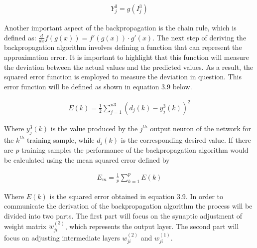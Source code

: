 \documentclass[
  12pt,
]{report}
\begin{document}
\begin{equation}
\begin{aligned}
Y_{j}^3 = g(I_{j}^3)
\label{eq:equation 3.8}
\end{aligned}
\end{equation} \vspace{-1em}

Another important aspect of the backpropagation is the chain rule, which
is defined as: \(\frac{d}{dx} f(g(x)) = f'(g(x)) \cdot g'(x)\). The next
step of deriving the backpropagation algorithm involves defining a
function that can represent the approximation error. It is important to
highlight that this function will measure the deviation between the
actual values and the predicted values. As a result, the squared error
function is employed to measure the deviation in question. This error
function will be defined as shown in equation 3.9 below.

\vspace{-1em}

\begin{equation}
\begin{aligned}
E(k) = \frac{1}{2} \sum_{j=1}^{n3} \left( d_j(k) - y_j^3(k) \right)^2
\label{eq:equation 3.9}
\end{aligned}
\end{equation} \vspace{-1em}

Where \(y_{j}^3 (k)\) is the value produced by the \(j^{th}\) output
neuron of the network for the \(k^{th}\) training sample, while
\(d_j (k)\) is the corresponding desired value. If there are \(p\)
training samples the performance of the backpropagation algorithm would
be calculated using the mean squared error defined by

\vspace{-1em}

\begin{equation}
\begin{aligned}
E_m = \frac{1}{p} \sum_{k=1}^{p} E(k)
\label{eq:equation 3.10}
\end{aligned}
\end{equation} \vspace{-1em}

Where \(E(k)\) is the squared error obtained in equation 3.9. In order
to communicate the derivation of the backpropagation algorithm the
process will be divided into two parts. The first part will focus on the
synaptic adjustment of weight matrix \(w_{ji}^(3)\), which represents
the output layer. The second part will focus on adjusting intermediate
layers \(w_{ji}^(2)\) and \(w_{ji}^(1)\).
\end{document}
